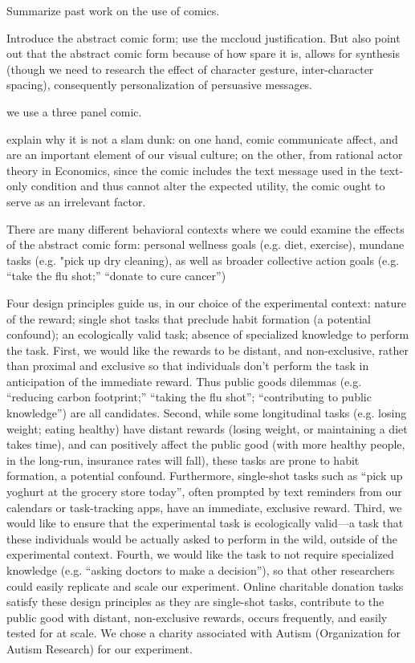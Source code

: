 Summarize past work on the use of comics.


Introduce the abstract comic form; use the mccloud justification. But also point out that the abstract comic form because of how spare it is, allows for synthesis (though we need to research the effect of character gesture, inter-character spacing), consequently personalization of persuasive messages.

we use a three panel comic.

explain why it is not a slam dunk: on one hand, comic communicate affect, and are an important element of our visual culture; on the other, from rational actor theory in Economics, since the comic includes the text message used in the text-only condition and thus cannot alter the expected utility, the comic ought to serve as an irrelevant factor. 
 

There are many different behavioral contexts where we could examine the effects of the abstract comic form: personal wellness goals (e.g. diet, exercise), mundane tasks (e.g. "pick up dry cleaning), as well as broader collective action goals (e.g. ``take the flu shot;'' ``donate to cure cancer'')

Four design principles guide us, in our choice of the experimental context: nature of the reward; single shot tasks that preclude habit formation (a potential confound); an ecologically valid task; absence of specialized knowledge to perform the task. First, we would like the rewards to be distant, and non-exclusive, rather than proximal and exclusive so that individuals don't perform the task in anticipation of the immediate reward. Thus public goods dilemmas (e.g. ``reducing carbon footprint;'' ``taking the flu shot''; ``contributing to public knowledge'') are all candidates. Second, while some longitudinal tasks (e.g. losing weight; eating healthy) have distant rewards (losing weight, or maintaining a diet takes time), and can positively affect the public good (with more healthy people, in the long-run, insurance rates will fall), these tasks are prone to habit formation, a potential confound. Furthermore, single-shot tasks such as ``pick up yoghurt at the grocery store today'', often prompted by text reminders from our calendars or task-tracking apps, have an immediate, exclusive reward. Third, we would like to ensure that the experimental task is ecologically valid---a task that these individuals would be actually asked to perform in the wild, outside of the experimental context. Fourth, we would like the task to not require specialized knowledge (e.g. ``asking doctors to make a decision''), so that other researchers could easily replicate and scale our experiment. Online charitable donation tasks satisfy these design principles as they are single-shot tasks, contribute to the public good with distant, non-exclusive rewards, occurs frequently, and easily tested for at scale. We chose a charity associated with Autism (Organization for Autism Research) for our experiment.

